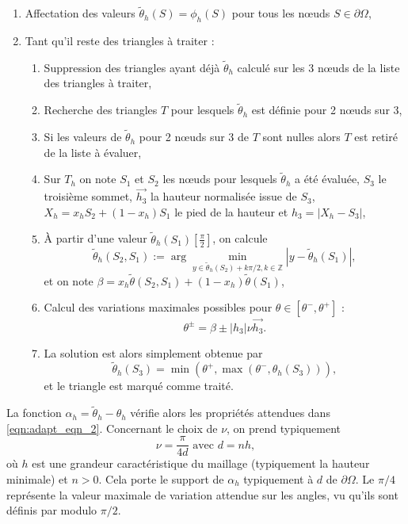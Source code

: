\begin{enumerate}
    \item Affectation des valeurs $\tilde{\theta}_h(S) = \phi_h(S)$ pour tous les nœuds $S \in \partial\Omega$,\\
    \item Tant qu'il reste des triangles à traiter :\\
    \begin{enumerate}
        \item Suppression des triangles ayant déjà $\tilde{\theta}_h$ calculé sur les 3 nœuds de la liste des triangles à traiter,\\
        \item Recherche des triangles $T$ pour lesquels $\tilde{\theta}_h$ est définie pour 2 nœuds sur 3,\\
        \item Si les valeurs de $\tilde{\theta}_h$ pour 2 nœuds sur 3 de $T$ sont nulles alors $T$ est retiré de la liste à évaluer,\\
        \item Sur $T_h$ on note $S_1$ et $S_2$ les nœuds pour lesquels $\tilde{\theta}_h$ a été évaluée, $S_3$ le troisième sommet, $\overrightarrow{h_3}$ la hauteur normalisée issue de $S_3$, $X_h = x_hS_2 +(1-x_h)S_1$ le pied de la hauteur et $h_3 = |X_h - S_3|$,\\
        \item À partir d'une valeur $\tilde{\theta}_h(S_1) \left[ \frac{\pi}{2} \right]$, on calcule
        \[
        \tilde{\theta}_h(S_2, S_1) := \arg\min_{y\in{\tilde{\theta}_h(S_2)+k\pi/2, k\in\mathbb{Z}}}
        \left|y - \tilde{\theta}_h(S_1)\right|,
        \]
        et on note $\beta = x_h \tilde{\theta}(S_2, S_1) + (1 - x_h)\tilde{\theta}(S_1)$,\\
        \item Calcul des variations maximales possibles pour $\theta \in [\theta^-, \theta^+]$ :
        \[
        \theta^\pm = \beta \pm |h_3|\nu\overrightarrow{h_3}.
        \]
        \item La solution est alors simplement obtenue par
    \[
    \tilde{\theta}_h(S_3) = \min(\theta^+, \max(\theta^-, \theta_h(S_3))),
    \]
    et le triangle est marqué comme traité.
    \end{enumerate}
\end{enumerate}
La fonction $\alpha_h = \tilde{\theta}_h - \theta_h$ vérifie alors les propriétés attendues dans \eqref{eqn:adapt_eqn_2}. Concernant le choix de $\nu$, on prend typiquement
\[
\nu = \frac{\pi}{4d} \mbox{ avec } d = nh,
\]
où $h$ est une grandeur caractéristique du maillage (typiquement la hauteur minimale) et $n > 0$. Cela porte le support de $\alpha_h$ typiquement à $d$ de $\partial\Omega$. Le $\pi/4$ représente la valeur maximale de variation attendue sur les angles, vu qu’ils sont définis par modulo $\pi/2$.


